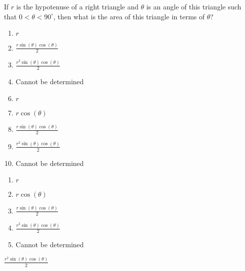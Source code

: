 



  If $r$ is the hypotenuse of a right triangle and $\theta$ is an angle of this triangle such that $0<\theta<90^\circ$, then what is the area of this triangle in terms of $\theta$?


\ifsat
	\begin{enumerate}[label=\Alph*)]
		\item    $r$
		\item $\frac{r\sin(\theta)\cos(\theta)}{2}$
		\item $\frac{r^{2}\sin(\theta)\cos(\theta)}{2}$ %
		\item  Cannot be determined
	\end{enumerate}
\else
\fi

\ifacteven
	\begin{enumerate}[label=\textbf{\Alph*.},itemsep=\fill,align=left]
		\setcounter{enumii}{5}
		\item    $r$
		\item  $r\cos(\theta)$ 
		\item $\frac{r\sin(\theta)\cos(\theta)}{2}$
		\addtocounter{enumii}{1}
		\item $\frac{r^{2}\sin(\theta)\cos(\theta)}{2}$ %
		\item  Cannot be determined
	\end{enumerate}
\else
\fi

\ifactodd
	\begin{enumerate}[label=\textbf{\Alph*.},itemsep=\fill,align=left]
		\item    $r$
		\item  $r\cos(\theta)$ 
		\item $\frac{r\sin(\theta)\cos(\theta)}{2}$
		\item $\frac{r^{2}\sin(\theta)\cos(\theta)}{2}$ %
		\item  Cannot be determined
	\end{enumerate}
\else
\fi

\ifgridin
 $\frac{r^{2}\sin(\theta)\cos(\theta)}{2}$ %
		
\else
\fi

